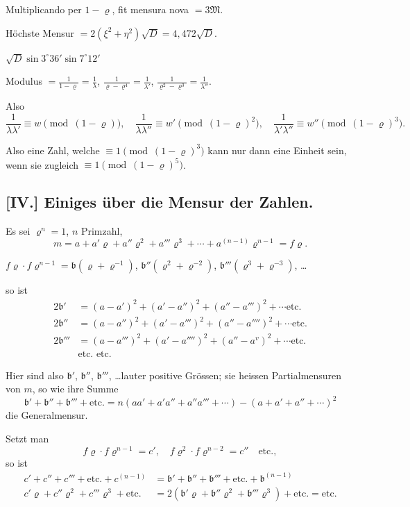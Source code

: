 \documentclass[10pt,a4paper]{article}
\begin{document}
Multiplicando per $1 - \varrho$, fit mensura nova $= 3\mathfrak{M}$.

Höchste Mensur $= 2(\xi^2 + \eta^2)\sqrt{D} = 4{,}472\sqrt{D}$.

$\sqrt{D} \sin 3^\circ 36' \sin 7^\circ 12'$

Modulus $= \frac{1}{1 - \varrho} = \frac{1}{\lambda}$, $\frac{1}{\varrho - \varrho^4} = \frac{1}{\lambda'}$, $\frac{1}{\varrho^2 - \varrho^3} = \frac{1}{\lambda''}$.

Also
\[
\frac{1}{\lambda\lambda'} \equiv w \pmod{(1 - \varrho)}, \quad \frac{1}{\lambda\lambda''} \equiv w' \pmod{(1 - \varrho)^2}, \quad \frac{1}{\lambda'\lambda''} \equiv w'' \pmod{(1 - \varrho)^3}.
\]

Also eine Zahl, welche $\equiv 1 \pmod{(1 - \varrho)^3}$ kann nur dann eine Einheit sein, wenn sie zugleich $\equiv 1 \pmod{(1 - \varrho)^5}$.

\newpage
\setcounter{page}{395}

\subsection*{[IV.] Einiges über die Mensur der Zahlen.}
\label{sec:IV}

Es sei $\varrho^n = 1$, $n$ Primzahl,
\[
m = a + a'\varrho + a''\varrho^2 + a'''\varrho^3 + \cdots + a^{(n-1)}\varrho^{n-1} = f\varrho.
\]

$f\varrho \cdot f\varrho^{n-1} = \mathfrak{b}(\varrho + \varrho^{-1})$, $\mathfrak{b}''(\varrho^2 + \varrho^{-2})$, $\mathfrak{b}'''(\varrho^3 + \varrho^{-3})$, \ldots

so ist
\begin{align*}
2\mathfrak{b}' &= (a - a')^2 + (a' - a'')^2 + (a'' - a''')^2 + \cdots \text{etc.} \\
2\mathfrak{b}'' &= (a - a'')^2 + (a' - a''')^2 + (a'' - a'''')^2 + \cdots \text{etc.} \\
2\mathfrak{b}''' &= (a - a''')^2 + (a' - a'''')^2 + (a'' - a^{v})^2 + \cdots \text{etc.} \\
&\text{etc. etc.}
\end{align*}

Hier sind also $\mathfrak{b}'$, $\mathfrak{b}''$, $\mathfrak{b}'''$, \ldots lauter positive Grössen; sie heissen Partialmensuren von $m$, so wie ihre Summe
\[
\mathfrak{b}' + \mathfrak{b}'' + \mathfrak{b}''' + \text{etc.} = n(aa' + a'a'' + a''a''' + \cdots) - (a + a' + a'' + \cdots)^2
\]
die Generalmensur.

Setzt man
\[
f\varrho \cdot f\varrho^{n-1} = c', \quad f\varrho^2 \cdot f\varrho^{n-2} = c'' \quad \text{etc.},
\]
so ist
\begin{align*}
c' + c'' + c''' + \text{etc.} + c^{(n-1)} &= \mathfrak{b}' + \mathfrak{b}'' + \mathfrak{b}''' + \text{etc.} + \mathfrak{b}^{(n-1)} \\
c'\varrho + c''\varrho^2 + c'''\varrho^3 + \text{etc.} &= 2(\mathfrak{b}'\varrho + \mathfrak{b}''\varrho^2 + \mathfrak{b}'''\varrho^3) + \text{etc.} = \text{etc.}
\end{align*}
\end{document}
